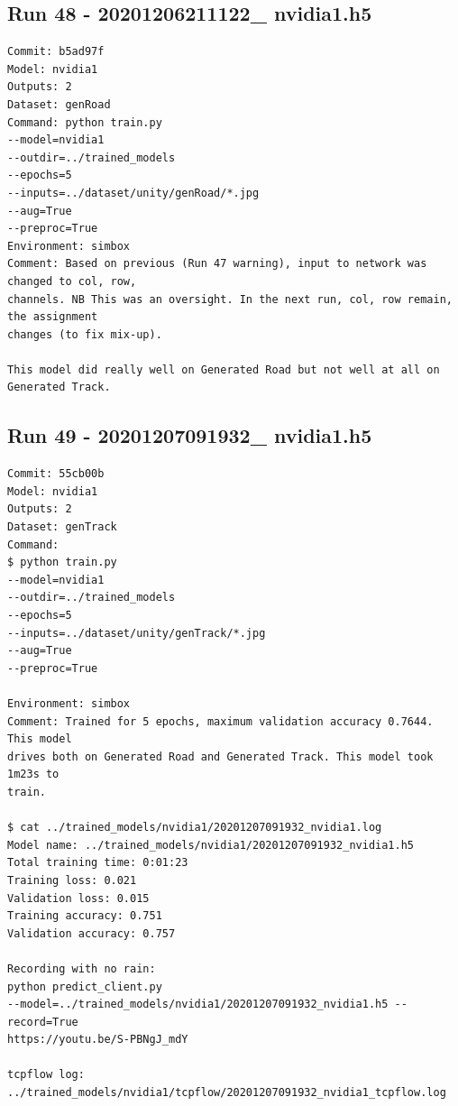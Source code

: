 \subsection{Run 48 - 20201206211122\_ nvidia1.h5}
\label{app_res:48}
\begin{verbatim}
Commit: b5ad97f
Model: nvidia1
Outputs: 2
Dataset: genRoad
Command: python train.py
--model=nvidia1
--outdir=../trained_models
--epochs=5
--inputs=../dataset/unity/genRoad/*.jpg
--aug=True
--preproc=True
Environment: simbox
Comment: Based on previous (Run 47 warning), input to network was changed to col, row,
channels. NB This was an oversight. In the next run, col, row remain, the assignment
changes (to fix mix-up).

This model did really well on Generated Road but not well at all on Generated Track.
\end{verbatim}

\subsection{Run 49 - 20201207091932\_ nvidia1.h5}
\label{app_res:49}
\begin{verbatim}
Commit: 55cb00b
Model: nvidia1
Outputs: 2
Dataset: genTrack
Command: 
$ python train.py
--model=nvidia1
--outdir=../trained_models
--epochs=5
--inputs=../dataset/unity/genTrack/*.jpg
--aug=True
--preproc=True

Environment: simbox
Comment: Trained for 5 epochs, maximum validation accuracy 0.7644. This model
drives both on Generated Road and Generated Track. This model took 1m23s to
train.

$ cat ../trained_models/nvidia1/20201207091932_nvidia1.log
Model name: ../trained_models/nvidia1/20201207091932_nvidia1.h5
Total training time: 0:01:23
Training loss: 0.021
Validation loss: 0.015
Training accuracy: 0.751
Validation accuracy: 0.757

Recording with no rain:
python predict_client.py
--model=../trained_models/nvidia1/20201207091932_nvidia1.h5 --record=True
https://youtu.be/S-PBNgJ_mdY

tcpflow log:
../trained_models/nvidia1/tcpflow/20201207091932_nvidia1_tcpflow.log

\end{verbatim}


